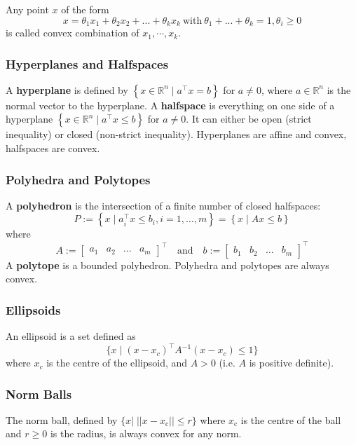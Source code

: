 Any point $x$ of the form
\begin{equation*}
    x=\theta_1x_1+\theta_2x_2+...+\theta_k x_k\mathrm{~with~}\theta_1+...+\theta_k=1,\theta_i\geq0
\end{equation*}
is called convex combination of $x_1,\cdots,x_k$.
\subsubsection{Hyperplanes and Halfspaces}
A \textbf{hyperplane} is defined by $\left\{x \in \mathbb{R}^n \mid a^\top x = b\right\}$ for $a \neq 0$, where $a \in \mathbb{R}^n$ is the normal vector to the hyperplane.
\newpar{}
A \textbf{halfspace} is everything on one side of a hyperplane $\left\{x \in \mathbb{R}^n \mid a^\top x \leq b\right\}$ for $a \neq 0$. It can either be open (strict inequality) or closed (non-strict inequality).
\newpar{}
Hyperplanes are affine and convex, halfspaces are convex.

\subsubsection{Polyhedra and Polytopes}
A \textbf{polyhedron} is the intersection of a finite number of closed halfspaces:
\begin{equation*}
    P := \left\{ x \mid a_i^\top x \leq b_i, i = 1, \ldots, m \right\} = \left\{ x \mid Ax \leq b \right\}
\end{equation*}
where
\begin{equation*}
    A := \begin{bmatrix} a_1 & a_2 & \ldots & a_m \end{bmatrix}^\top \quad \text{and} \quad b := \begin{bmatrix} b_1 & b_2 & \ldots & b_m \end{bmatrix}^\top
\end{equation*}
\newpar{}
A \textbf{polytope} is a bounded polyhedron.
\newpar{}
Polyhedra and polytopes are always convex.
\subsubsection{Ellipsoids}
An ellipsoid is a set defined as
\begin{equation*}
    \{x \mid {(x - x_c)}^\top A^{-1}(x - x_c) \leq 1\}
\end{equation*}
where $x_c$ is the centre of the ellipsoid, and $A > 0$ (i.e. $A$ is positive definite).

\subsubsection{Norm Balls}
The norm ball, defined by $\{x|\;||x-x_{\mathrm{c}}||\leq r\}$ where $x_{\mathrm{c}}$ is the centre of the ball
and $r\geq0$ is the radius, is always convex for any norm.
\newpar{}

